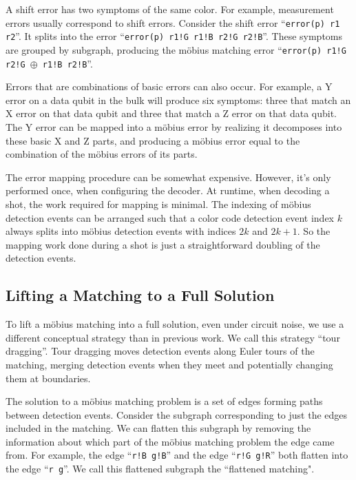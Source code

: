 \documentclass[onecolumn,unpublished,a4paper]{quantumarticle}
\theoremstyle{definition}
\theoremstyle{definition}
\theoremstyle{definition}
\begin{document}
A shift error has two symptoms of the same color.
For example, measurement errors usually correspond to shift errors.
Consider the shift error ``\texttt{error(p) r1 r2}''.
It splits into the error ``\texttt{error(p) r1!G r1!B r2!G r2!B}''.
These symptoms are grouped by subgraph, producing the m{\"o}bius matching error ``\texttt{error(p) r1!G r2!G $\oplus$ r1!B r2!B}''.

Errors that are combinations of basic errors can also occur.
For example, a Y error on a data qubit in the bulk will produce six symptoms: three that match an X error on that data qubit and three that match a Z error on that data qubit.
The Y error can be mapped into a m{\"o}bius error by realizing it decomposes into these basic X and Z parts, and producing a m{\"o}bius error equal to the combination of the m{\"o}bius errors of its parts.

The error mapping procedure can be somewhat expensive.
However, it's only performed once, when configuring the decoder.
At runtime, when decoding a shot, the work required for mapping is minimal.
The indexing of m{\"o}bius detection events can be arranged such that a color code detection event index $k$ always splits into m{\"o}bius detection events with indices $2k$ and $2k+1$.
So the mapping work done during a shot is just a straightforward doubling of the detection events.


\subsection{Lifting a Matching to a Full Solution}
\label{sec:chromobius-lifting}

To lift a m{\"o}bius matching into a full solution, even under circuit noise, we use a different conceptual strategy than in previous work.
We call this strategy ``tour dragging''.
Tour dragging moves detection events along Euler tours of the matching, merging detection events when they meet and potentially changing them at boundaries.

The solution to a m{\"o}bius matching problem is a set of edges forming paths between detection events.
Consider the subgraph corresponding to just the edges included in the matching.
We can flatten this subgraph by removing the information about which part of the m{\"o}bius matching problem the edge came from.
For example, the edge ``\texttt{r!B g!B}'' and the edge ``\texttt{r!G g!R}'' both flatten into the edge ``\texttt{r g}''.
We call this flattened subgraph the ``flattened matching".
\end{document}
